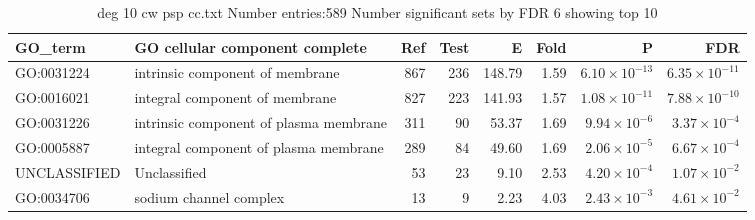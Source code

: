  
\begin{table}[ht]
\centering
\begin{tabular}{llrrrrrr}
  \hline
GO\_term & GO cellular component complete & Ref & Test & E & Fold & P & FDR \\ 
  \hline
GO:0031224 & intrinsic component of membrane  & 867 & 236 & 148.79 & 1.59 & $6.10 \times 10^{-13}$ & $6.35 \times 10^{-11}$ \\ 
  GO:0016021 & integral component of membrane  & 827 & 223 & 141.93 & 1.57 & $1.08 \times 10^{-11}$ & $7.88 \times 10^{-10}$ \\ 
  GO:0031226 & intrinsic component of plasma membrane  & 311 & 90 & 53.37 & 1.69 & $9.94 \times 10^{-6}$ & $3.37 \times 10^{-4}$ \\ 
  GO:0005887 & integral component of plasma membrane  & 289 & 84 & 49.60 & 1.69 & $2.06 \times 10^{-5}$ & $6.67 \times 10^{-4}$ \\ 
  UNCLASSIFIED & Unclassified  & 53 & 23 & 9.10 & 2.53 & $4.20 \times 10^{-4}$ & $1.07 \times 10^{-2}$ \\ 
  GO:0034706 & sodium channel complex  & 13 & 9 & 2.23 & 4.03 & $2.43 \times 10^{-3}$ & $4.61 \times 10^{-2}$ \\ 
  \hline
\end{tabular}
\caption{deg 10 cw psp cc.txt Number entries:589 Number significant sets by FDR 6 showing top 10} 
\label{tab:deg 10 cw psp cc.txt Number entries:589 Number significant sets by FDR 6 showing top 10}
\end{table}
